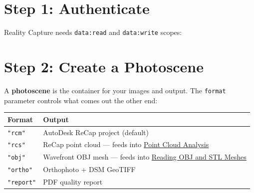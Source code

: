 \documentclass[
  11pt,
  letterpaper,
  DIV=11,
  numbers=noendperiod]{scrreprt}
\newenvironment{Shaded}{\begin{snugshade}}{\end{snugshade}}
\newcommand{\AttributeTok}[1]{\textcolor[rgb]{0.40,0.45,0.13}{#1}}
\newcommand{\FunctionTok}[1]{\textcolor[rgb]{0.28,0.35,0.67}{#1}}
\newcommand{\NormalTok}[1]{\textcolor[rgb]{0.00,0.23,0.31}{#1}}
\newcommand{\OtherTok}[1]{\textcolor[rgb]{0.00,0.23,0.31}{#1}}
\newcommand{\SpecialCharTok}[1]{\textcolor[rgb]{0.37,0.37,0.37}{#1}}
\newcommand{\StringTok}[1]{\textcolor[rgb]{0.13,0.47,0.30}{#1}}
\begin{document}
\section{Step 1: Authenticate}\label{step-1-authenticate}

Reality Capture needs \texttt{data:read} and \texttt{data:write} scopes:

\begin{Shaded}
\end{Shaded}

\section{Step 2: Create a Photoscene}\label{step-2-create-a-photoscene}

A \textbf{photoscene} is the container for your images and output. The
\texttt{format} parameter controls what comes out the other end:

\begin{longtable}[]{@{}
  >{\raggedright\arraybackslash}p{}
  >{\raggedright\arraybackslash}p{}@{}}
\toprule\noalign{}
\begin{minipage}[b]{\linewidth}\raggedright
Format
\end{minipage} & \begin{minipage}[b]{\linewidth}\raggedright
Output
\end{minipage} \\
\midrule\noalign{}
\endhead
\bottomrule\noalign{}
\endlastfoot
\texttt{"rcm"} & AutoDesk ReCap project (default) \\
\texttt{"rcs"} & ReCap point cloud --- feeds into
\href{point-cloud-analysis.qmd}{Point Cloud Analysis} \\
\texttt{"obj"} & Wavefront OBJ mesh --- feeds into
\href{mesh-reading.qmd}{Reading OBJ and STL Meshes} \\
\texttt{"ortho"} & Orthophoto + DSM GeoTIFF \\
\texttt{"report"} & PDF quality report \\
\end{longtable}
\end{document}
